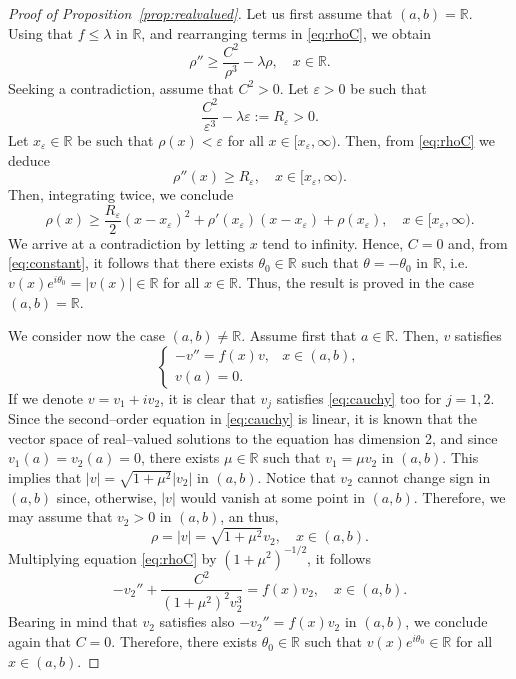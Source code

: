 \documentclass[11pt]{article}
\newcommand{\R}{\mathbb{R}}
\theoremstyle{plain}
\theoremstyle{definition}
\theoremstyle{remark}
\numberwithin{equation}{section}
\begin{document}
{\begin{proof}[Proof of Proposition~\ref{prop:realvalued}]
    Let us first assume that $(a,b)=\R$.  Using that $f\leq\lambda$ in $\R$, and rearranging terms in \eqref{eq:rhoC}, we obtain
    \begin{equation}\label{eq:rho''}
        \rho''\geq \frac{C^2}{\rho^3}-\lambda\rho,\quad x\in \R.
    \end{equation}
    Seeking a contradiction, assume that $C^2>0$. Let $\varepsilon>0$ be such that
    \[\frac{C^2}{\varepsilon^3}-\lambda\varepsilon:=R_\varepsilon>0.\]
    Let $x_\varepsilon\in \R$ be such that $\rho(x)<\varepsilon$ for all $x\in [x_\varepsilon,\infty)$. Then, from \eqref{eq:rhoC} we deduce
    \begin{equation}\label{eq:rho''R}
    \rho''(x)\geq R_\varepsilon,\quad x\in [x_\varepsilon,\infty).
    \end{equation}
    Then, integrating twice, we conclude
    \[\rho(x)\geq \frac{
    R_\varepsilon}{2}(x-x_\varepsilon)^2+\rho'(x_\varepsilon)(x-x_\varepsilon)+\rho(x_\varepsilon),\quad x\in [x_\varepsilon,\infty).\]
    We arrive at a contradiction by letting $x$ tend to infinity. Hence, $C=0$ and, from \eqref{eq:constant}, it follows that there exists $\theta_0\in\R$ such that $\theta=-\theta_0$ in $\R$, i.e. $v(x)e^{i\theta_0}=|v(x)|\in\R$ for all $x\in\R$. Thus, the result is proved in the case $(a,b)=\R$.

    We consider now the case $(a,b)\not=\R$. Assume first that $a\in\R$. Then, $v$ satisfies 
    \begin{equation}\label{eq:cauchy}
        \begin{cases}
            -v''=f(x)v, &x\in (a,b),
            \\
            v(a)=0.
        \end{cases}
    \end{equation}
    If we denote $v=v_1+iv_2$, it is clear that $v_j$ satisfies \eqref{eq:cauchy} too for $j=1,2$. Since the second--order equation in \eqref{eq:cauchy} is linear, it is known that the vector space of real--valued solutions to the equation has dimension 2, and since $v_1(a)=v_2(a)=0$, there exists $\mu\in\R$ such that $v_1=\mu v_2$ in $(a,b)$. This implies that $|v|=\sqrt{1+\mu^2}|v_2|$ in $(a,b)$. Notice that $v_2$ cannot change sign in $(a,b)$ since, otherwise, $|v|$ would vanish at some point in $(a,b)$. Therefore, we may assume that $v_2>0$ in $(a,b)$, an thus, 
    \[\rho=|v|=\sqrt{1+\mu^2}v_2,\quad x\in (a,b).\]
    Multiplying equation \eqref{eq:rhoC} by $(1+\mu^2)^{-1/2}$, it follows
    \[-v_2''+\frac{C^2}{(1+\mu^2)^2 v_2^3}=f(x)v_2,\quad x\in (a,b).\]
    Bearing in mind that $v_2$ satisfies also $-v_2''=f(x)v_2$ in $(a,b)$, we conclude again that $C=0$. Therefore, there exists $\theta_0\in\R$ such that $v(x)e^{i\theta_0}\in\R$ for all $x\in(a,b)$. 
    

\end{proof}}
\end{document}
